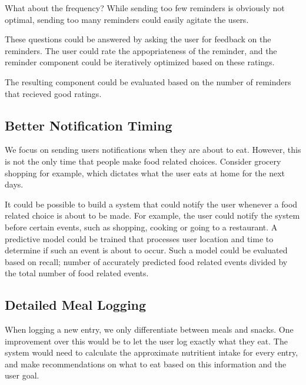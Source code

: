What about the frequency?
While sending too few reminders is obviously not optimal, 
sending too many reminders could easily agitate the users.

These questions could be answered by asking the user for feedback on the reminders.
The user could rate the appopriateness of the reminder,
and the reminder component could be iteratively optimized based on these ratings.

The resulting component could be evaluated based on the number of reminders that recieved good ratings.

\subsection{Better Notification Timing}
We focus on sending users notifications when they are about to eat.
However, this is not the only time that people make food related choices.
Consider grocery shopping for example, which dictates what the user eats at home for the next days.

It could be possible to build a system that could notify the user whenever a food related choice is about to be made.
For example, the user could notify the system before certain events, such as shopping, cooking or going to a restaurant.
A predictive model could be trained that processes user location and time to determine if such an event is about to occur. 
Such a model could be evaluated based on recall; number of accurately predicted food related events divided by the total number of food related events.

\subsection{Detailed Meal Logging}
When logging a new entry, we only differentiate between meals and snacks.
One improvement over this would be to let the user log exactly what they eat.
The system would need to calculate the approximate nutritient intake for every entry,
and make recommendations on what to eat based on this information and the user goal.

